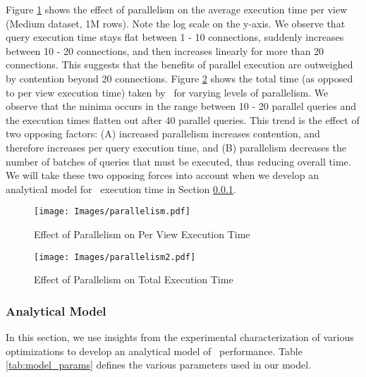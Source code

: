 Figure \ref{fig:parallelism} shows the effect of parallelism on the average
execution time per view (Medium dataset, 1M rows). Note the log scale on the
y-axis.
We observe that query execution time stays flat between 1 - 10 connections, suddenly increases between
10 - 20 connections, and then increases linearly for more than 20 connections.
This suggests that the benefits of parallel execution are outweighed by
contention beyond 20 connections. Figure \ref{fig:parallelism_total} shows the
total time (as opposed to per view execution time) taken by \VizRecDB\ for varying
levels of parallelism. We observe that the minima occurs in the range between 10
- 20 parallel queries and the execution times flatten out after 40 parallel
queries.
This trend is the effect of two opposing factors: (A) increased parallelism
increases contention, and therefore increases per query execution time, and (B)
parallelism decreases the number of batches of queries that must be executed,
thus reducing overall time.
We will take these two opposing forces into account when we develop an
analytical model for \VizRecDB\ execution time in Section \ref{sec:model}.

\begin{figure}[h]
  \centering 
    \texttt{[image: Images/parallelism.pdf]}
      \caption{Effect of Parallelism on Per View Execution Time} 
        \label{fig:parallelism}
\end{figure}



\begin{figure}[h]
  \centering
    \texttt{[image: Images/parallelism2.pdf]}
  \caption{Effect of Parallelism on Total Execution Time} 
    \label{fig:parallelism_total}
\end{figure}




\subsubsection{Analytical Model}
\label{sec:model}
In this section, we use insights from the experimental characterization of
various optimizations to develop an analytical model of \VizRecDB\ performance.
Table \ref{tab:model_params} defines the various parameters used in our model.

